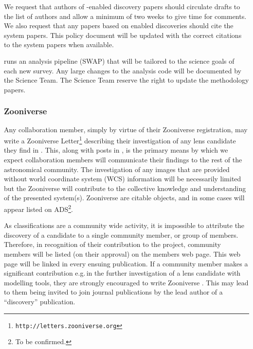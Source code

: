 \documentclass[a4paper]{article}
\begin{document}
We request that authors of \sw-enabled discovery papers should circulate drafts to the list of \sw authors and allow a minimum of two weeks to give time for comments. We also request that any papers based on \sw enabled discoveries should cite the \sw system papers. This policy document will be updated with the correct citations to the \sw system papers when available.

\sw runs an analysis pipeline (SWAP) that will be tailored to the science goals of each new survey. Any large changes to the analysis code will be documented  by the \sw Science Team. The \sw Science Team reserve the right to update the \sw methodology papers.





\subsubsection{Zooniverse \Letters}
\label{sec:comm}

Any \sw collaboration member, simply by virtue of their Zooniverse
registration, may write a Zooniverse
Letter\footnote{\texttt{http://letters.zooniverse.org}} describing their
investigation of any lens candidate they find in \sw. This, along with
posts in  \Talk, is the primary means by which we expect collaboration
members will communicate their findings to the rest of the
astronomical community. The investigation of any \sw images that are
provided without world coordinate system (WCS) information will be
necessarily limited but the \sw Zooniverse \Letters will contribute to the collective knowledge and understanding of the presented system(s). Zooniverse \Letters are citable
objects, and in some cases will appear listed on ADS\footnote{To be confirmed.}. 


As \sw classifications are a community wide activity, it is impossible to attribute the discovery of a candidate to a single community member, or group  of members. Therefore, in recognition of their contribution to the \sw project, \sw community members will be listed (on their approval) on the \sw members web page. This web page will be linked in every ensuing \sw publication. If a community member makes a significant contribution e.g.\,in the further investigation of a lens candidate with modelling tools, they are strongly encouraged to write Zooniverse \Letters. This may lead to them being invited to join journal publications by the lead author of a ``discovery'' publication. 
\end{document}
